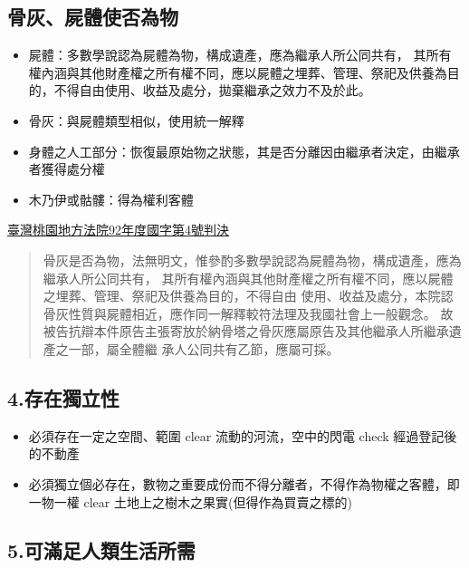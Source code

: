 \documentclass[
]{book}
\begin{document}
\pagebreak

\hypertarget{ux9aa8ux7070ux5c4dux9ad4ux4f7fux5426ux70baux7269}{%
\subsection{骨灰、屍體使否為物}\label{ux9aa8ux7070ux5c4dux9ad4ux4f7fux5426ux70baux7269}}

\begin{itemize}
\item
  屍體：多數學說認為屍體為物，構成遺產，應為繼承人所公同共有， 其所有權內涵與其他財產權之所有權不同，應以屍體之埋葬、管理、祭祀及供養為目的，不得自由使用、收益及處分，拋棄繼承之效力不及於此。
\item
  骨灰：與屍體類型相似，使用統一解釋
\item
  身體之人工部分：恢復最原始物之狀態，其是否分離因由繼承者決定，由繼承者獲得處分權
\item
  木乃伊或骷髏：得為權利客體
\end{itemize}

\href{\%22https://tyd.judicial.gov.tw\%22}{臺灣桃園地方法院92年度國字第4號判決}

\begin{quote}
骨灰是否為物，法無明文，惟參酌多數學說認為屍體為物，構成遺產，應為繼承人所公同共有， 其所有權內涵與其他財產權之所有權不同，應以屍體之埋葬、管理、祭祀及供養為目的，不得自由 使用、收益及處分，本院認骨灰性質與屍體相近，應作同一解釋較符法理及我國社會上一般觀念。 故被告抗辯本件原告主張寄放於納骨塔之骨灰應屬原告及其他繼承人所繼承遺產之一部，屬全體繼 承人公同共有乙節，應屬可採。
\end{quote}

\hypertarget{ux5b58ux5728ux7368ux7acbux6027}{%
\subsection{4.存在獨立性}\label{ux5b58ux5728ux7368ux7acbux6027}}

\begin{itemize}
\item
  必須存在一定之空間、範圍
  clear
  流動的河流，空中的閃電
  check
  經過登記後的不動產
\item
  必須獨立個必存在，數物之重要成份而不得分離者，不得作為物權之客體，即一物一權
  clear
  土地上之樹木之果實(但得作為買賣之標的)
\end{itemize}

\hypertarget{ux53efux6effux8db3ux4ebaux985eux751fux6d3bux6240ux9700}{%
\subsection{5.可滿足人類生活所需}\label{ux53efux6effux8db3ux4ebaux985eux751fux6d3bux6240ux9700}}
\end{document}
